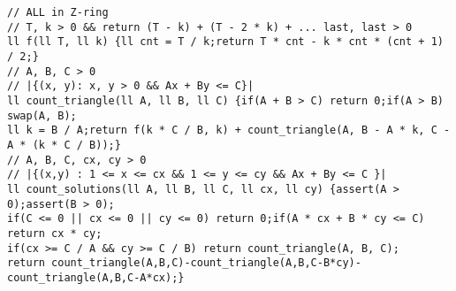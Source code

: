 \documentclass[12pt]{article}
\begin{document}
\begin{verbatim}
// ALL in Z-ring
// T, k > 0 && return (T - k) + (T - 2 * k) + ... last, last > 0
ll f(ll T, ll k) {ll cnt = T / k;return T * cnt - k * cnt * (cnt + 1) / 2;}
// A, B, C > 0
// |{(x, y): x, y > 0 && Ax + By <= C}|
ll count_triangle(ll A, ll B, ll C) {if(A + B > C) return 0;if(A > B) swap(A, B);
ll k = B / A;return f(k * C / B, k) + count_triangle(A, B - A * k, C - A * (k * C / B));}
// A, B, C, cx, cy > 0
// |{(x,y) : 1 <= x <= cx && 1 <= y <= cy && Ax + By <= C }|
ll count_solutions(ll A, ll B, ll C, ll cx, ll cy) {assert(A > 0);assert(B > 0);
if(C <= 0 || cx <= 0 || cy <= 0) return 0;if(A * cx + B * cy <= C) return cx * cy;
if(cx >= C / A && cy >= C / B) return count_triangle(A, B, C);
return count_triangle(A,B,C)-count_triangle(A,B,C-B*cy)-count_triangle(A,B,C-A*cx);}
\end{verbatim}
\end{document}
